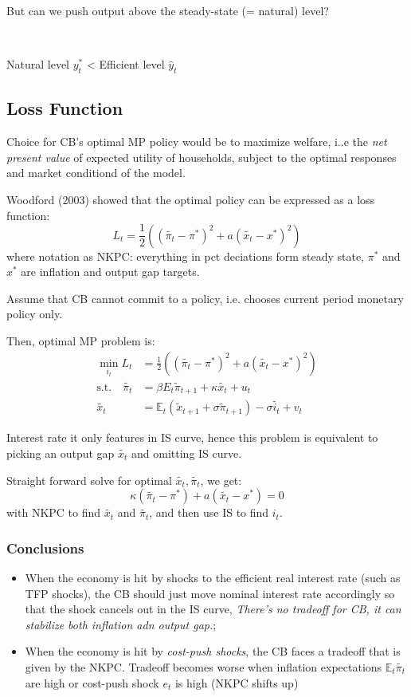 But can we push output above the steady-state (= natural) level?

\begin{note}
    \

    Natural level $y_t^*$ < Efficient level $\hat{y}_t$
\end{note}

\subsection{Loss Function}
Choice for CB's optimal MP policy would be to maximize welfare, i..e the \textit{net present value} of 
expected utility of households, subject to the optimal responses and market conditiond of the model.

Woodford (2003) showed that the optimal policy can be expressed as a loss function:
\[L_t = \frac{1}{2} \left( (\tilde{\pi_t} - \pi^*)^{2} + a(\tilde{x_t} - x^*)^2 \right)\]
where notation as NKPC: everything in pct deciations form steady state, $\pi^*$ and $x^*$ are inflation and output gap targets.

Assume that CB cannot commit to a policy, i.e. chooses current period monetary policy only.

Then, optimal MP problem is:
\begin{align*}
    \min_{i_t} L_t &= \frac{1}{2} \left( (\tilde{\pi_t} - \pi^*)^{2} + a(\tilde{x_t} - x^*)^2 \right) \\
    \text{s.t.} \quad \tilde{\pi_t} &= \beta E_t \tilde{\pi}_{t+1} + \kappa \tilde{x_t} + u_t \\
    \tilde{x_t} &= \mathbb{E}_t(\tilde{x}_{t+1} + \sigma \tilde{\pi}_{t+1}) - \sigma \tilde{i_t} + v_t
\end{align*}

Interest rate it only features in IS curve, hence this problem is
equivalent to picking an output gap $\tilde{x_t}$ and omitting IS curve.

Straight forward solve for optimal $\tilde{x_t}, \tilde{\pi_t}$, we get:
\[\kappa(\tilde{\pi_t} - \pi^*) + a(\tilde{x_t} - x^*) = 0\]
with NKPC to find $\tilde{x_t}$ and $\tilde{\pi_t}$, and then use IS to find $i_t$.

\subsubsection{Conclusions}
\begin{itemize}
    \item When the economy is hit by shocks to the efficient real
    interest rate (such as TFP shocks), the CB should just move
    nominal interest rate accordingly so that the shock cancels
    out in the IS curve, \textit{There's no tradeoff for CB, it can stabilize
    both inflation adn output gap.};
    \item When the economy is hit by \textit{cost-push shocks}, 
    the CB faces a tradeoff that is given by the NKPC.
    Tradeoff becomes worse when inflation expectations $\mathbb{E}_t \tilde{\pi_t}$
    are high or cost-push shock $e_t$ is high (NKPC shifts up)
\end{itemize}

